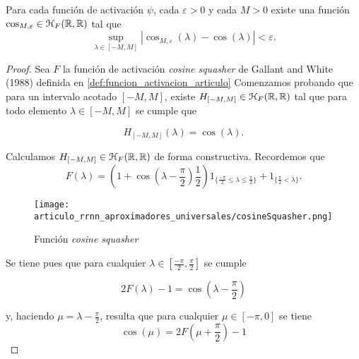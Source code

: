 \begin{lema}\label{lema:A_3_función_activación_continua_con_arbitaria}
    Para cada función de activación $\psi$, cada $\varepsilon >0$
    y cada $M>0$ existe una función 
    $\cos_{M,\varepsilon} \in \mathcal{H}_F{(\mathbb{R}, \mathbb{R})}$ tal que 
    \begin{equation}
        \sup_{ \lambda \in [-M, M]}
        |\cos_{M,\varepsilon}(\lambda) - \cos(\lambda)|
        < 
        \varepsilon. 
    \end{equation}
\end{lema}
\begin{proof}
    Sea $F$ la función de activación \textit{cosine squasher} de Gallant and White (1988) definida 
    en \ref{def:funcion_activacion_articulo} Comenzamos probando que para un intervalo acotado $[-M, M]$, existe $H_{[-M, M]} \in \mathcal{H}_F{(\mathbb{R}, \mathbb{R})}$ 
    tal que para todo elemento $\lambda \in [-M, M]$ se cumple que 

    \begin{equation}
        H_{[-M, M]}(\lambda) = \cos(\lambda).
    \end{equation}

    Calculamos $H_{[-M, M]} \in \mathcal{H}_F{(\mathbb{R}, \mathbb{R})}$  de forma constructiva. Recordemos que  
    \begin{equation}
        F(\lambda )= \left(1 + \cos\left(\lambda -\frac{\pi}{2} \right) \frac{1}{2}\right) 
         1_{\{\frac{-\pi}{2} \leq \lambda \leq  \frac{\pi}{2}\}}
         +
         1_{\{ \frac{\pi}{2} < \lambda \}}.
    \end{equation}
    
    \begin{figure}[h]
        \centering
        \texttt{[image: articulo\_rrnn\_aproximadores\_universales/cosineSquasher.png]}
        \caption{Función \textit{cosine squasher}}
        \label{fig:cosine_squaser}
    \end{figure}

    Se tiene pues que para cualquier $\lambda \in \left[ \frac{-\pi}{2}, \frac{\pi}{2}\right]$ se cumple

    \begin{equation}
        2 F(\lambda)-1 = \cos \left( \lambda - \frac{\pi}{2}\right)
    \end{equation}

    y, haciendo $\mu = \lambda - \frac{\pi}{2}$, resulta que para cualquier
    $\mu \in [-\pi, 0]$ se tiene 
    \begin{equation}
        \cos(\mu) = 2 F \left(\mu + \frac{\pi}{2} \right)  -1 
    \end{equation}


\end{proof}
